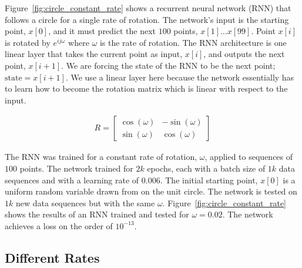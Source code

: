 Figure~\ref{fig:circle_constant_rate} shows a recurrent neural network (RNN) that follows a circle for a single rate of rotation.  The network's input is the starting point, $x[0]$, and it must predict the next $100$ points, $x[1] \ldots x[99]$.  Point $x[i]$ is rotated by $e^{ij\omega}$ where $\omega$ is the rate of rotation.  The RNN architecture is one linear layer that takes the current point as input, $x[i]$, and outputs the next point, $x[i+1]$.  We are forcing the state of the RNN to be the next point; $\text{state} = x[i+1]$.  We use a linear layer here because the network essentially has to learn how to become the rotation matrix which is linear with respect to the input. 

\begin{align}
R = \begin{bmatrix}
\cos(\omega) & - \sin(\omega) \\
\sin(\omega) & \cos(\omega)
\end{bmatrix}
\end{align} 

The RNN was trained for a constant rate of rotation, $\omega$, applied to sequences of $100$ points.  The network trained for $2k$ epochs, each with a batch size of $1k$ data sequences and with a learning rate of $0.006$.  The initial starting point, $x[0]$ is a uniform random variable drawn from on the unit circle. 
The network is tested on $1k$ new data sequences but with the same $\omega$.
Figure~\ref{fig:circle_constant_rate} shows the results of an RNN trained and tested for $\omega=0.02$.  The network achieves a loss on the order of $10^{-13}$.  

\subsection{Different Rates}

